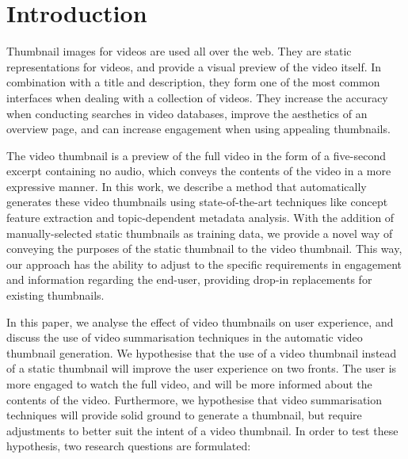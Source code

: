 \documentclass{../resources/sig-alternate-05-2015}
\begin{document}

\printccsdesc


\section{Introduction}
\label{introduction}




Thumbnail images for videos are used all over the web. They are static representations for videos, and provide a visual preview of the video itself. In combination with a title and description, they form one of the most common interfaces when dealing with a collection of videos. They increase the accuracy when conducting searches in video databases, improve the aesthetics of an overview page, and can increase engagement when using appealing thumbnails.

The video thumbnail is a preview of the full video in the form of a five-second excerpt containing no audio, which conveys the contents of the video in a more expressive manner. In this work, we describe a method that automatically generates these video thumbnails using state-of-the-art techniques like concept feature extraction and topic-dependent metadata analysis. With the addition of manually-selected static thumbnails as training data, we provide a novel way of conveying the purposes of the static thumbnail to the video thumbnail. This way, our approach has the ability to adjust to the specific requirements in engagement and information regarding the end-user, providing drop-in replacements for existing thumbnails.

In this paper, we analyse the effect of video thumbnails on user experience, and discuss the use of video summarisation techniques in the automatic video thumbnail generation. We hypothesise that the use of a video thumbnail instead of a static thumbnail will improve the user experience on two fronts. The user is more engaged to watch the full video, and will be more informed about the contents of the video. Furthermore, we hypothesise that video summarisation techniques will provide solid ground to generate a thumbnail, but require adjustments to better suit the intent of a video thumbnail. In order to test these hypothesis, two research questions are formulated:
\end{document}
